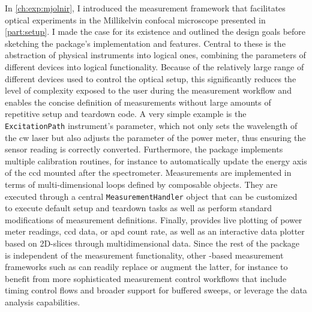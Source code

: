 In \cref{ch:exp:mjolnir}, I introduced the \mjolnir measurement framework that facilitates optical experiments in the Millikelvin confocal microscope presented in \cref{part:setup}.
I made the case for its existence and outlined the design goals before sketching the package's implementation and features.
Central to these is the abstraction of physical instruments into logical ones, combining the parameters of different devices into logical functionality.
Because of the relatively large range of different devices used to control the optical setup, this significantly reduces the level of complexity exposed to the user during the measurement workflow and enables the concise definition of measurements without large amounts of repetitive setup and teardown code.
A very simple example is the \texttt{ExcitationPath} instrument's  parameter, which not only sets the wavelength of the \gls{cw} laser but also adjusts the  parameter of the power meter, thus ensuring the sensor reading is correctly converted.
Furthermore, the package implements multiple calibration routines, for instance to automatically update the energy axis of the \gls{ccd} mounted after the spectrometer.
Measurements are implemented in terms of multi-dimensional loops defined by composable  objects.
They are executed through a central \texttt{MeasurementHandler} object that can be customized to execute default setup and teardown tasks as well as perform standard modifications of measurement definitions.
Finally, \mjolnir provides live plotting of power meter readings, \gls{ccd} data, or \gls{apd} count rate, as well as an interactive data plotter based on 2D-slices through multidimensional data.
Since the rest of the package is independent of the measurement functionality, other \qcodes-based measurement frameworks such as  can readily replace or augment the latter, for instance to benefit from more sophisticated measurement control workflows that include timing control flows and broader support for buffered sweeps, or leverage the data analysis capabilities.

